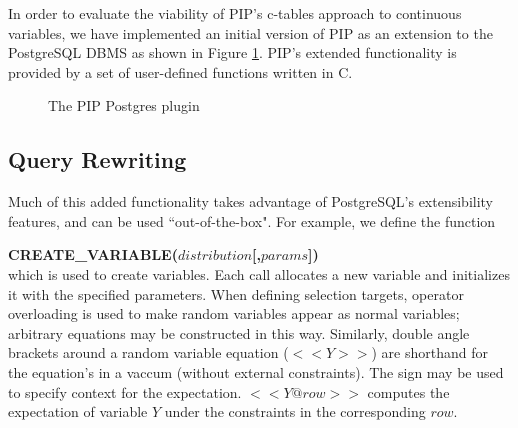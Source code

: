 In order to evaluate the viability of PIP's c-tables approach to continuous variables, we have implemented an initial version of PIP as an extension to the PostgreSQL DBMS as shown in Figure \ref{fig:blockdiag}.  PIP's extended functionality is provided by a set of user-defined functions written in C.  

\begin{figure}
\begin{center}
\caption{The PIP Postgres plugin}
\label{fig:blockdiag}
\end{center}
\end{figure}

\subsection{Query Rewriting}
Much of this added functionality takes advantage of PostgreSQL's extensibility features, and can be used ``out-of-the-box".  For example, we define the function 

\textbf{CREATE\_VARIABLE($distribution$[,$params$])} \\
which is used to create variables.  Each call allocates a new variable and initializes it with the specified parameters.  When defining selection targets, operator overloading is used to make random variables appear as normal variables; arbitrary equations may be constructed in this way.  Similarly, double angle brackets around a random variable equation ($<< Y >>$) are shorthand for the equation's in a vaccum (without external constraints).  The \@ sign may be used to specify context for the expectation.  $<< Y @ row >>$ computes the expectation of variable $Y$ under the constraints in the corresponding $row$.

